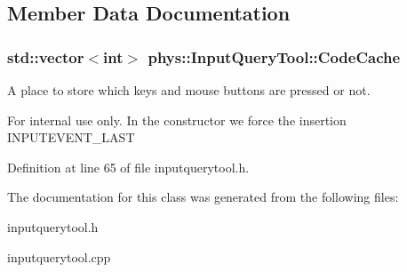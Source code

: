\subsection{Member Data Documentation}
\hypertarget{classphys_1_1InputQueryTool_ae4ca82bd8afc87c2f07cef779449c60b}{
\subsubsection[{CodeCache}]{\setlength{\rightskip}{0pt plus 5cm}std::vector$<$int$>$ {\bf phys::InputQueryTool::CodeCache}}}
\label{da/d96/classphys_1_1InputQueryTool_ae4ca82bd8afc87c2f07cef779449c60b}


A place to store which keys and mouse buttons are pressed or not. 

\begin{DoxyInternal}{For internal use only.}
In the constructor we force the insertion INPUTEVENT\_\-LAST \end{DoxyInternal}


Definition at line 65 of file inputquerytool.h.



The documentation for this class was generated from the following files:\begin{DoxyCompactItemize}
\item 
inputquerytool.h\item 
inputquerytool.cpp\end{DoxyCompactItemize}
